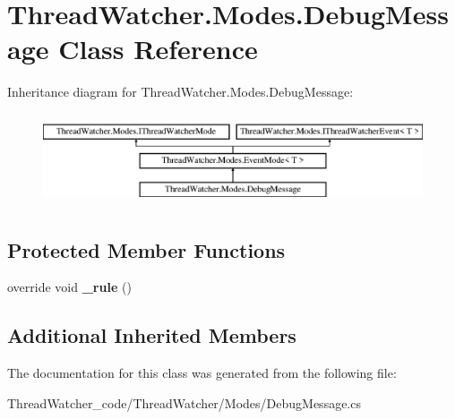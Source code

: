 \hypertarget{class_thread_watcher_1_1_modes_1_1_debug_message}{\section{Thread\+Watcher.\+Modes.\+Debug\+Message Class Reference}
\label{class_thread_watcher_1_1_modes_1_1_debug_message}
}
Inheritance diagram for Thread\+Watcher.\+Modes.\+Debug\+Message\+:\begin{figure}[H]
\begin{center}
\leavevmode
\includegraphics[height=2.745098cm]{class_thread_watcher_1_1_modes_1_1_debug_message}
\end{center}
\end{figure}
\subsection*{Protected Member Functions}
\begin{DoxyCompactItemize}
\item 
\hypertarget{class_thread_watcher_1_1_modes_1_1_debug_message_a4007a918e8a77425cfc2a1841929de96}{override void {\bfseries \+\_\+rule} ()}\label{class_thread_watcher_1_1_modes_1_1_debug_message_a4007a918e8a77425cfc2a1841929de96}

\end{DoxyCompactItemize}
\subsection*{Additional Inherited Members}


The documentation for this class was generated from the following file\+:\begin{DoxyCompactItemize}
\item 
Thread\+Watcher\+\_\+code/\+Thread\+Watcher/\+Modes/Debug\+Message.\+cs\end{DoxyCompactItemize}
